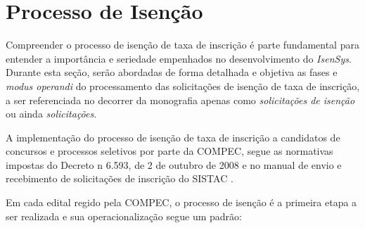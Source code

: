 \documentclass[
	12pt,			%
	openright,		%
	oneside,	
	a4paper,		%
	english,		%
	brazil			%
]{abntex2/abntex2}  %
\begin{document}
		\section{Processo de Isenção} \label{isencao}
		
			Compreender o processo de isenção de taxa de inscrição é parte fundamental para entender a importância e seriedade empenhados no desenvolvimento do \textit{IsenSys}. Durante esta seção, serão abordadas de forma detalhada e objetiva as fases e \textit{modus operandi} do processamento das solicitações de isenção de taxa de inscrição, a ser referenciada no decorrer da monografia apenas como \textit{solicitações de isenção} ou ainda \textit{solicitações}.
		
			A implementação do processo de isenção de taxa de inscrição a candidatos de concursos e processos seletivos por parte da COMPEC, segue as normativas impostas do Decreto n{\textdegree} 6.593, de 2 de outubro de 2008 \cite{cadunico-decreto} e no manual de envio e recebimento de solicitações de inscrição do SISTAC \cite{sistac-formatos}.
			
			Em cada edital regido pela COMPEC, o processo de isenção é a primeira etapa a ser realizada e sua operacionalização segue um padrão:
			
\end{document}
